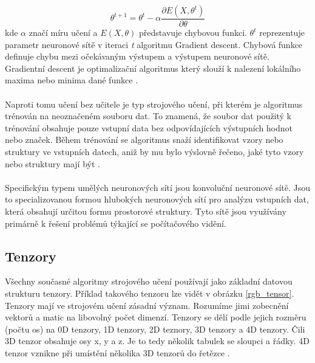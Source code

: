 \begin{equation}
\theta^{t+1}=\theta^t-\alpha \frac{\partial E\left(X, \theta^t\right)}{\partial \theta}
\end{equation}
kde \begin{math}\alpha\end{math} značí míru učení a \begin{math} E\left(X, \theta\right)\end{math} představuje chybovou funkci. \begin{math}\theta^t\end{math} reprezentuje parametr neuronové sítě v iteraci \textit{t} algoritmu Gradient descent. Chybová funkce definuje chybu mezi očekávaným výstupem a výstupem neuronové sítě. Gradientní descent je optimalizační algoritmus který slouží k nalezení lokálního maxima nebo minima dané funkce \cite{brilliant-backpropagation}.

\paragraph{}
Naproti tomu učení bez učitele je typ strojového učení, při kterém je algoritmus trénován na neoznačeném souboru dat. To znamená, že soubor dat použitý k trénování obsahuje pouze vstupní data bez odpovídajících výstupních hodnot nebo značek. Během trénování se algoritmus snaží identifikovat vzory nebo struktury ve vstupních datech, aniž by mu bylo výslovně řečeno, jaké tyto vzory nebo struktury mají být \cite{neural1}.
\paragraph{}
Specifickým typem umělých neuronových sítí jsou konvoluční neuronové sítě. Jsou to specializovanou formou hlubokých neuronových sítí pro analýzu vstupních dat, která obsahují určitou formu prostorové struktury. Tyto sítě jsou využívány primárně k řešení problémů týkající se počítačového vidění.
\subsection*{Tenzory}
Všechny současné algoritmy strojového učení používají jako základní datovou strukturu tenzory. Příklad takového tenzoru lze vidět v obrázku \ref{rgb_tensor}. Tenzory mají ve strojovém učení zásadní význam. Rozumíme jimi zobecnění vektorů a matic na libovolný počet dimenzí. Tenzory se dělí podle jejich rozměru (počtu os) na 0D tenzory, 1D tenzory, 2D teznory, 3D tenzory a 4D tenzory. Čili 3D tenzor obsahuje osy x, y a z. Je to tedy několik tabulek se sloupci a řádky. 4D tenzor vznikne při umístění několika 3D tenzorů do řetězce \cite{neural2}.

